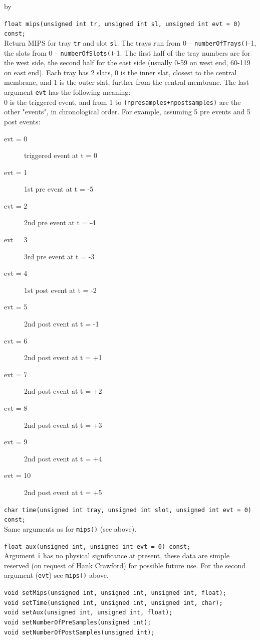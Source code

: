 \documentclass[twoside]{article}
\newcommand{\entrylabel}[1]{\mbox{\textbf{{#1}}}\hfil}%
\newenvironment{entry}
{\begin{list}{}%
    {\renewcommand{\makelabel}{\entrylabel}%
     \setlength{\labelwidth}{90pt}%
     \setlength{\leftmargin}{\labelwidth}
     \advance\leftmargin by \labelsep%
      }%
    }%
  {\end{list}}
\newcommand{\Entrylabel}[1]%
{\raisebox{0pt}[1ex][0pt]{\makebox[\labelwidth][l]%
    {\parbox[t]{\labelwidth}{\hspace{0pt}\textbf{{#1}}}}}}
\newenvironment{Entry}%
{\renewcommand{\entrylabel}{\Entrylabel}\begin{entry}}%
  {\end{entry}}
\begin{document}
\begin{Entry}
    \verb+float mips(unsigned int tr, unsigned int sl, unsigned int evt = 0) const;+\\
    Return MIPS for tray \texttt{tr} and slot \texttt{sl}.  The trays
    run from 0 -- \texttt{numberOfTrays()}-1, the slots from 0 --
    \texttt{numberOfSlots()}-1. The first half of the tray numbers are
    for the west side, the second half for the east side (usually 0-59
    on west end, 60-119 on east end).  Each tray has 2 slats, 0 is the
    inner slat, closest to the central membrane, and 1 is the outer
    slat, further from the central membrane.  The last argument
    \texttt{evt} has  the following meaning:\\
    0 is the triggered event, and
    from 1 to \texttt{(npresamples+npostsamples)} are the other "events",
    in chronological order.  For example, assuming 5 pre events and 5
    post events:
    \begin{description}
    \item[evt = 0] triggered event at t = 0
    \item[evt = 1] 1st pre event at t = -5
    \item[evt = 2] 2nd pre event at t = -4
    \item[evt = 3] 3rd pre event at t = -3
    \item[evt = 4] 1st post event at t = -2
    \item[evt = 5] 2nd post event at t = -1
    \item[evt = 6] 2nd post event at t = +1
    \item[evt = 7] 2nd post event at t = +2
    \item[evt = 8] 2nd post event at t = +3
    \item[evt = 9] 2nd post event at t = +4
    \item[evt = 10] 2nd post event at t = +5
    \end{description}
    
    \verb+char time(unsigned int tray, unsigned int slot, unsigned int evt = 0) const;+\\
    Same arguments as for \texttt{mips()} (see above).
     
    \verb+float aux(unsigned int, unsigned int evt = 0) const;+\\
    Argument \texttt{i} has no physical significance at present, these
    data are simple reserved (on request of Hank Crawford) for
    possible future use.  For the second argument (\texttt{evt}) see
    \texttt{mips()} above.

    \verb+void setMips(unsigned int, unsigned int, unsigned int, float);+\\
    \verb+void setTime(unsigned int, unsigned int, unsigned int, char);+\\
    \verb+void setAux(unsigned int, unsigned int, float);+\\
    \verb+void setNumberOfPreSamples(unsigned int);+\\
    \verb+void setNumberOfPostSamples(unsigned int);+\\
\end{Entry}
\clearpage
\end{document}
